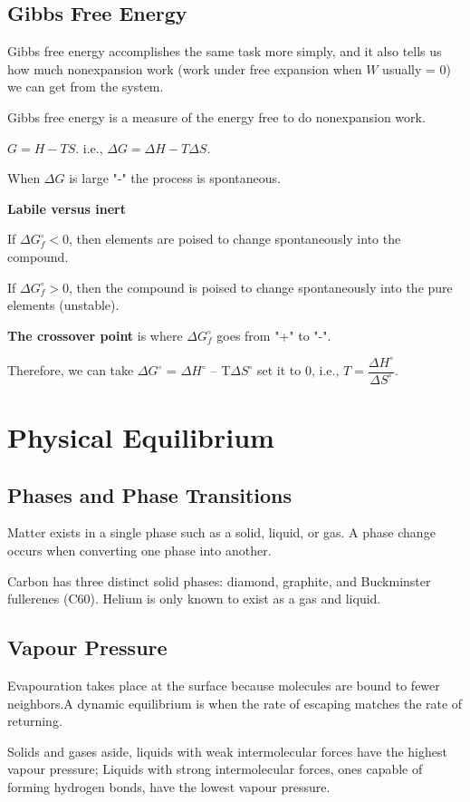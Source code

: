 \documentclass[a4paper,12pt]{article}
\begin{document}
\subsection{Gibbs Free Energy}
Gibbs free energy accomplishes the same task more simply, and it also tells us how much nonexpansion work (work under free expansion when $W$ usually = 0) we can get from the system.\par
Gibbs free energy is a measure of the energy free to do nonexpansion work.\par
$G = H - TS$. i.e., $\Delta G =\Delta H - T\Delta S$.\par
When $\Delta G$ is large "-" the process is spontaneous.\par
\textbf{Labile versus inert}\par
If $\Delta G_{f}^{\circ}<0$, then elements are poised to change spontaneously into the compound.\par
If $\Delta G_{f}^{\circ}>0$, then the compound is poised to change spontaneously into the pure elements (unstable).\par
\textbf{The crossover point} is where $\Delta G_{f}^{\circ}$ goes from "+" to "-".\par Therefore, we can take $\Delta G^{\circ}$ = $\Delta H^{\circ}$ – T$\Delta S^{\circ}$ set it to 0, i.e., $T=\dfrac{\Delta H^{\circ}}{\Delta S^{\circ}}$.

\newpage
\section{Physical Equilibrium}
\subsection{Phases and Phase Transitions}
Matter exists in a single phase such as a solid, liquid, or gas. A phase change occurs when converting one phase into another.\par
Carbon has three distinct solid phases: diamond, graphite, and Buckminster fullerenes (C60). Helium is only known to exist as a gas and liquid.
\subsection{Vapour Pressure}
Evapouration takes place at the surface because molecules are bound to fewer neighbors.A dynamic equilibrium is when the rate of escaping matches the rate of returning.\par
Solids and gases aside, liquids with weak intermolecular forces have the highest vapour pressure; Liquids with strong intermolecular forces, ones capable of forming hydrogen bonds, have the lowest vapour pressure.
\end{document}
